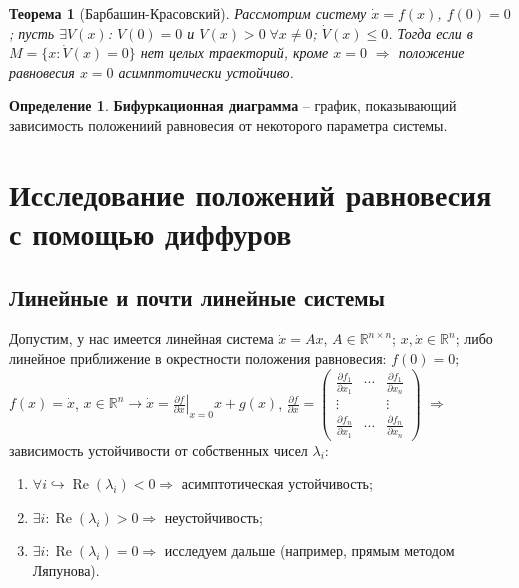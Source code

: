 \documentclass[12pt, a4paper]{article}
\theoremstyle{plain}
\newtheorem{theorem}{Теорема}[section] %
\theoremstyle{definition}
\newtheorem{definition}{Определение}[section]
\theoremstyle{remark}
\begin{document}
\begin{theorem}[Барбашин-Красовский]
Рассмотрим систему $\dot{x} = f(x)$, $f(0) = 0$; пусть $\exists V(x)$: $V(0) = 0$ и $V(x) > 0 \; \forall x \neq 0$; $\dot{V}(x) \leqslant 0$. Тогда если в $M = \{x: \dot{V}(x) = 0\}$ нет целых траекторий, кроме $x = 0$ $\Rightarrow$ положение равновесия $x = 0$ асимптотически устойчиво.
\end{theorem}

\begin{definition}
    \textbf{Бифуркационная диаграмма} -- график, показывающий зависимость положениий равновесия от некоторого параметра системы.
\end{definition}



\section{Исследование положений равновесия с помощью диффуров}
\subsection{Линейные и почти линейные системы}

Допустим, у нас имеется линейная система $\dot{x} = Ax$, $A \in \mathbb{R}^{n \times n}$; $x, \dot{x} \in \mathbb{R}^n$; либо линейное приближение в окрестности положения равновесия: $f(0) = 0$; $f(x) = \dot{x}$, $x \in \mathbb{R}^n \to \dot{x} = \left.\frac{\partial f}{\partial x}\right|_{x=0} x + g(x)$, $\frac{\partial f}{\partial x} = \begin{pmatrix} \frac{\partial f_1}{\partial x_1} & \cdots & \frac{\partial f_1}{\partial x_n} \\ \vdots & & \vdots \\ \frac{\partial f_n}{\partial x_1} & \cdots & \frac{\partial f_n}{\partial x_n} \end{pmatrix}$ $\Rightarrow$ зависимость устойчивости от собственных чисел $\lambda_i$:

\begin{enumerate}
    \item $\forall i \hookrightarrow  \operatorname{Re}(\lambda_i) < 0 \Rightarrow$ асимптотическая устойчивость;
    \item $\exists i: \operatorname{Re}(\lambda_i) > 0 \Rightarrow$ неустойчивость;
    \item $\exists i: \operatorname{Re}(\lambda_i) = 0 \Rightarrow$ исследуем дальше (например, прямым методом Ляпунова).
\end{enumerate}
\end{document}

